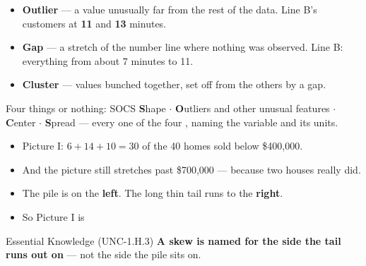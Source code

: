 \documentclass[aspectratio=169, 11pt]{beamer}
\begin{document}
\begin{frame}[t, plain]
  \vspace{4pt}
  \begin{itemize}\setlength{\itemsep}{7pt}
    \item \textbf{\color{navy}Outlier} --- a value unusually far from the rest of the data.
          Line B's customers at \textbf{11} and \textbf{13} minutes.
    \item \textbf{\color{navy}Gap} --- a stretch of the number line where nothing was observed.
          Line B: everything from about 7 minutes to 11.
    \item \textbf{\color{navy}Cluster} --- values bunched together, set off from the others by
          a gap.
  \end{itemize}
  \vspace{10pt}
  \begin{block}{Four things or nothing: SOCS}
    \textbf{S}hape $\cdot$ \textbf{O}utliers and other unusual features $\cdot$
    \textbf{C}enter $\cdot$ \textbf{S}pread --- every one of the four ,
    naming the variable and its units.
  \end{block}
\end{frame}

\begin{frame}[t, plain]
  \vspace{6pt}
  \begin{itemize}\setlength{\itemsep}{8pt}
    \item Picture I: $6+14+10 = 30$ of the 40 homes sold below \$400{,}000.
    \item And the picture still stretches past \$700{,}000 --- because two houses really did.
    \item The pile is on the \textbf{left}. The long thin tail runs to the \textbf{right}.
    \item So Picture I is 
  \end{itemize}
  \vspace{10pt}
  \begin{block}{Essential Knowledge (UNC-1.H.3)}
    \textbf{A skew is named for the side the tail runs out on} --- not the side the pile
    sits on.
  \end{block}
\end{frame}
\end{document}
